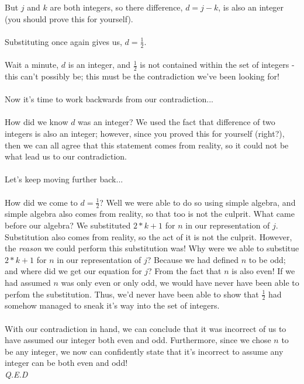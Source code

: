 \documentclass[a4paper,12pt]{article}
\begin{document}
But $j$ and $k$ are both integers, so there difference, $d = j - k$, is also an integer (you should prove this for yourself).\\
\\ 
Substituting once again gives us, $d = \frac{1}{2}$.\\
\\
Wait a minute, $d$ is an integer, and $\frac{1}{2}$ is not contained within the set of integers - this can't possibly be; this must be the contradiction we've been looking for!\\
\\
Now it's time to work backwards from our contradiction...\\
\\
How did we know $d$ was an integer? We used the fact that difference of two integers is also an integer; however, since you proved this for yourself (right?), then we can all agree that this statement comes from reality, so it could not be what lead us to our contradiction.\\ 
\\
Let's keep moving further back...\\
\\
How did we come to $d = \frac{1}{2}$? Well we were able to do so using simple algebra, and simple algebra also comes from reality, so that too is not the culprit. What came before our algebra? We substituted $2*k + 1$ for $n$ in our representation of $j$. Substitution also comes from reality, so the act of it is not the culprit. However, the \textit{reason} we could perform this substitution was! Why were we able to substitue $2*k + 1$ for $n$ in our representation of $j$? Because we had defined $n$ to be odd; and where did we get our equation for $j$? From the fact that $n$ is also even! If we had assumed $n$ was only even or only odd, we would have never have been able to perfom the substitution. Thus, we'd never have been able to show that $\frac{1}{2}$ had somehow managed to sneak it's way into the set of integers.\\
\\
With our contradiction in hand, we can conclude that it was incorrect of us to have assumed our integer both even and odd. Furthermore, since we chose $n$ to be any integer, we now can confidently state that it's incorrect to assume any integer can be both even and odd!\\
\textit{Q.E.D}   
\end{document}
